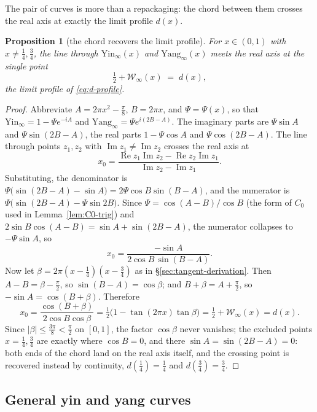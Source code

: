\documentclass[11pt]{article}
\newtheorem{proposition}[theorem]{Proposition}
\theoremstyle{definition}
\begin{document}
The pair of curves is more than a repackaging: the chord between them
crosses the real axis at exactly the limit profile $d(x)$.

\begin{proposition}[the chord recovers the limit profile]
\label{prop:yinyang-chord}
For $x\in(0,1)$ with $x\neq\tfrac14,\tfrac34$, the line through
$\mathrm{Yin}_{\infty}(x)$ and $\mathrm{Yang}_{\infty}(x)$ meets the
real axis at the single point
\[
\tfrac12+\mathcal W_{\infty}(x)\;=\;d(x),
\]
the limit profile of \eqref{eq:d-profile}.
\end{proposition}

\begin{proof}
Abbreviate $A=2\pi x^{2}-\tfrac\pi8$, $B=2\pi x$, and $\Psi=\Psi(x)$, so
that $\mathrm{Yin}_{\infty}=1-\Psi e^{-iA}$ and
$\mathrm{Yang}_{\infty}=\Psi e^{i(2B-A)}$. The imaginary parts are
$\Psi\sin A$ and $\Psi\sin(2B-A)$, the real parts $1-\Psi\cos A$ and
$\Psi\cos(2B-A)$. The line through points $z_{1},z_{2}$ with
$\operatorname{Im}z_{1}\neq\operatorname{Im}z_{2}$ crosses the real
axis at
\[
x_{0}
=\frac{\operatorname{Re}z_{1}\operatorname{Im}z_{2}
-\operatorname{Re}z_{2}\operatorname{Im}z_{1}}
{\operatorname{Im}z_{2}-\operatorname{Im}z_{1}} .
\]
Substituting, the denominator is
$\Psi\bigl(\sin(2B-A)-\sin A\bigr)=2\Psi\cos B\sin(B-A)$, and the
numerator is $\Psi\bigl(\sin(2B-A)-\Psi\sin 2B\bigr)$. Since
$\Psi=\cos(A-B)/\cos B$ (the form of $C_0$ used in
Lemma~\ref{lem:C0-trig}) and $2\sin B\cos(A-B)=\sin A+\sin(2B-A)$, the
numerator collapses to $-\Psi\sin A$, so
\[
x_{0}=\frac{-\sin A}{2\cos B\,\sin(B-A)} .
\]
Now let $\beta=2\pi(x-\tfrac14)(x-\tfrac34)$ as in
\S\ref{sec:tangent-derivation}. Then $A-B=\beta-\tfrac\pi2$, so
$\sin(B-A)=\cos\beta$; and $B+\beta=A+\tfrac\pi2$, so
$-\sin A=\cos(B+\beta)$. Therefore
\[
x_{0}
=\frac{\cos(B+\beta)}{2\cos B\cos\beta}
=\tfrac12\bigl(1-\tan(2\pi x)\tan\beta\bigr)
=\tfrac12+\mathcal W_{\infty}(x)
=d(x).
\]
Since $|\beta|\le\tfrac{3\pi}8<\tfrac\pi2$ on $[0,1]$, the factor
$\cos\beta$ never vanishes; the excluded points $x=\tfrac14,\tfrac34$
are exactly where $\cos B=0$, and there $\sin A=\sin(2B-A)=0$: both ends
of the chord land on the real axis itself, and the crossing point is
recovered instead by continuity, $d(\tfrac14)=\tfrac14$ and
$d(\tfrac34)=\tfrac34$.
\end{proof}

\subsection{General yin and yang curves}\label{sec:yinyang-general}
\end{document}
